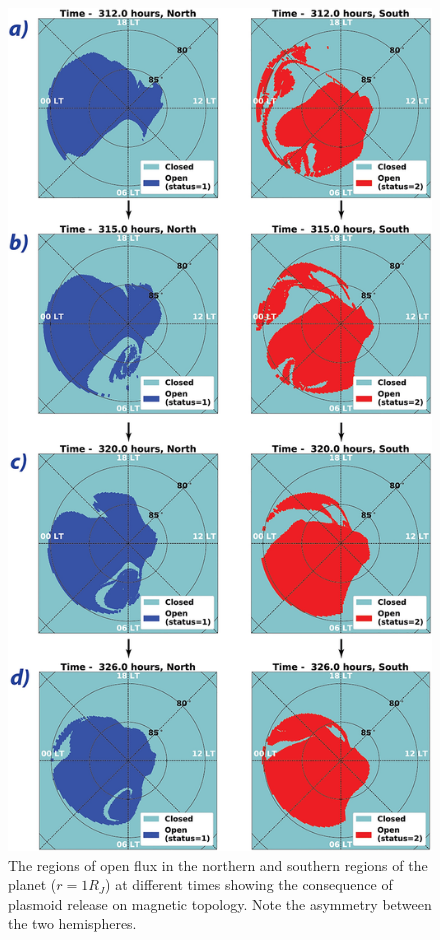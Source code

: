 \begin{figure}
    \centering
    \includegraphics[height=0.9\textheight]{images4/open-flux-variation.jpg}
    \caption{The regions of open flux in the northern and southern regions of the planet ($r=1R_J$) at different times showing the consequence of plasmoid release on magnetic topology. Note the asymmetry between the two hemispheres.}
    \label{fig:open-flux-hemisphere}
\end{figure}


